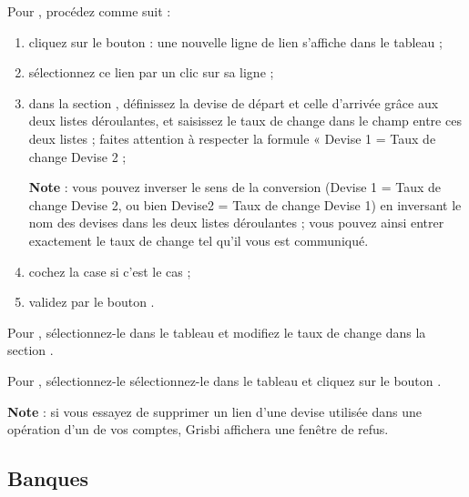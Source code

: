 Pour , procédez comme suit :

\begin{enumerate}
	\item cliquez sur le bouton  : une nouvelle ligne de lien s'affiche dans le tableau   ;
	\item sélectionnez ce lien par un clic sur sa ligne ;
	\item dans la section  , définissez la devise de départ et celle d'arrivée grâce aux deux listes déroulantes, et saisissez le taux de change dans le champ entre ces deux listes ; faites attention à respecter la formule « Devise 1 = Taux de change Devise 2 ;
	  
	  \textbf{Note} : vous pouvez inverser le sens de la conversion (Devise 1 =  Taux de change Devise 2, ou bien Devise2 = Taux de change Devise 1) en inversant le nom des devises dans les deux listes déroulantes ; vous pouvez ainsi entrer exactement le taux de change tel qu'il vous est communiqué. 
	\item cochez la case  si c'est le cas ;
	\item validez par le bouton .
\end{enumerate}

Pour , sélectionnez-le dans le tableau  et modifiez le taux de change dans la section .

Pour , sélectionnez-le sélectionnez-le dans le tableau  et cliquez sur le bouton .

\textbf{Note} : si vous essayez de supprimer un lien d'une devise utilisée dans une opération d'un de vos comptes, Grisbi affichera une fenêtre de refus.


\subsection{Banques\label{setup-resources-banks}}

